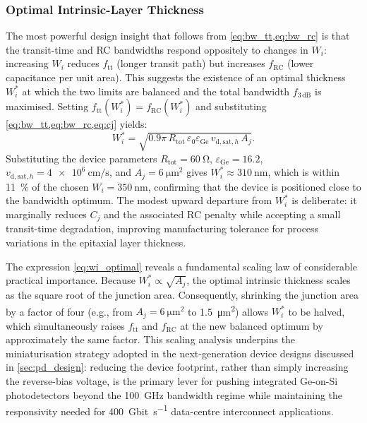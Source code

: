 \subsubsection{Optimal Intrinsic-Layer Thickness}

The most powerful design insight that follows from \cref{eq:bw_tt,eq:bw_rc}
is that the transit-time and RC bandwidths respond oppositely to changes in
$W_i$: increasing $W_i$ reduces $f_{\mathrm{tt}}$ (longer transit path) but
increases $f_{\mathrm{RC}}$ (lower capacitance per unit area). This suggests
the existence of an optimal thickness $W_i^*$ at which the two limits are
balanced and the total bandwidth $f_{3\,\mathrm{dB}}$ is maximised. Setting
$f_{\mathrm{tt}}(W_i^*) = f_{\mathrm{RC}}(W_i^*)$ and substituting
\cref{eq:bw_tt,eq:bw_rc,eq:cj} yields:
\begin{equation}
    W_i^* = \sqrt{0.9\pi\,R_{\mathrm{tot}}\,\varepsilon_0\varepsilon_{\mathrm{Ge}}
             \,v_{\mathrm{d,sat},h}\,A_j}.
    \label{eq:wi_optimal}
\end{equation}
Substituting the device parameters $R_{\mathrm{tot}} = \SI{60}{\ohm}$,
$\varepsilon_{\mathrm{Ge}} = 16.2$, $v_{\mathrm{d,sat},h} = \SI{4e6}{\centi\metre\per\second}$,
and $A_j = \SI{6}{\micro\metre\squared}$ gives $W_i^* \approx \SI{310}{\nano\metre}$,
which is within \SI{11}{\percent} of the chosen $W_i = \SI{350}{\nano\metre}$,
confirming that the device is positioned close to the bandwidth optimum. The
modest upward departure from $W_i^*$ is deliberate: it marginally reduces
$C_j$ and the associated RC penalty while accepting a small transit-time
degradation, improving manufacturing tolerance for process variations in the
epitaxial layer thickness.

The expression \cref{eq:wi_optimal} reveals a fundamental scaling law of
considerable practical importance. Because $W_i^* \propto \sqrt{A_j}$, the
optimal intrinsic thickness scales as the square root of the junction area.
Consequently, shrinking the junction area by a factor of four (e.g., from
$A_j = \SI{6}{\micro\metre\squared}$ to \SI{1.5}{\micro\metre\squared}) allows
$W_i^*$ to be halved, which simultaneously raises $f_{\mathrm{tt}}$ and
$f_{\mathrm{RC}}$ at the new balanced optimum by approximately the same factor.
This scaling analysis underpins the miniaturisation strategy adopted in the
next-generation device designs discussed in \cref{sec:pd_design}: reducing the
device footprint, rather than simply increasing the reverse-bias voltage, is the
primary lever for pushing integrated Ge-on-Si photodetectors beyond the
\SI{100}{\giga\hertz} bandwidth regime while maintaining the responsivity needed
for \SI{400}{\giga bit\per\second} data-centre interconnect applications.

